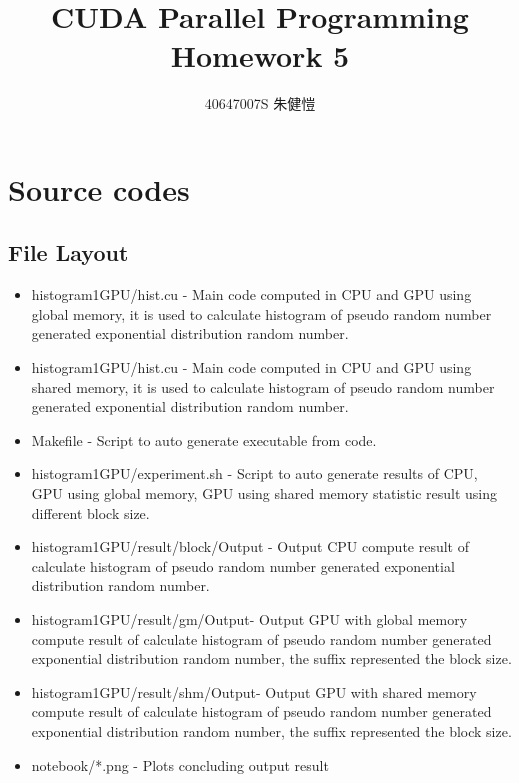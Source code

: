 \documentclass{article}
\title{CUDA Parallel Programming\\Homework 5}
\author{40647007S 朱健愷}
\begin{document}
	\maketitle
	\section{Source codes}
	\subsection{File Layout}
	\begin{itemize}
		\item histogram\textunderscore1GPU/hist.cu - Main code computed in CPU and GPU using global memory, it is used to calculate histogram of pseudo random number generated exponential distribution random number.
		\item histogram\textunderscore1GPU/hist.cu - Main code computed in CPU and GPU using shared memory, it is used to calculate histogram of pseudo random number generated exponential distribution random number.
		\item Makefile - Script to auto generate executable from code.
		\item histogram\textunderscore1GPU/experiment.sh - Script to auto generate results of CPU, GPU using global memory, GPU using shared memory statistic result using different block size.
		\item histogram\textunderscore1GPU/result/block/Output - Output CPU compute result of calculate histogram of pseudo random number generated exponential distribution random number.
		\item histogram\textunderscore1GPU/result/gm\textunderscore*/Output\textunderscore* - Output GPU with global memory compute result of calculate histogram of pseudo random number generated exponential distribution random number, the suffix represented the block size.
		\item histogram\textunderscore1GPU/result/shm\textunderscore*/Output\textunderscore* - Output GPU with shared memory compute result of calculate histogram of pseudo random number generated exponential distribution random number, the suffix represented the block size.
		\item notebook/*.png - Plots concluding output result
	\end{itemize}
	
\end{document}
